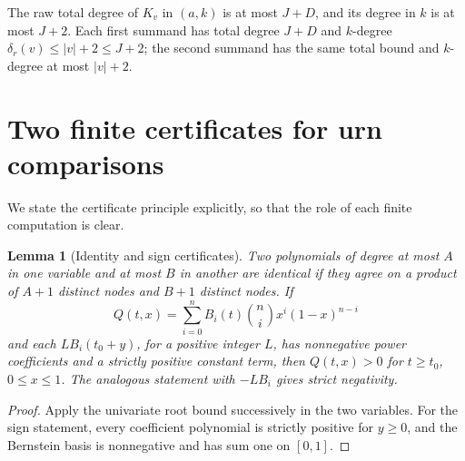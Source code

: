 \documentclass[11pt,a4paper]{article}
\newtheorem{lemma}[theorem]{Lemma}
\theoremstyle{remark}
\numberwithin{equation}{section}
\begin{document}
The raw total degree of \(K_v\) in \((a,k)\) is at most \(J+D\),
and its degree in \(k\) is at most \(J+2\). Each first summand has
total degree \(J+D\) and \(k\)-degree \(\delta_r(v)\le |v|+2\le J+2\);
the second summand has the same total bound and \(k\)-degree
at most \(|v|+2\).

\section{Two finite certificates for urn comparisons}\label{sec:urn}
We state the certificate principle explicitly, so that the role of
each finite computation is clear.

\begin{lemma}[Identity and sign certificates]\label{lem:certificate}
Two polynomials of degree at most \(A\) in one variable and at most
\(B\) in another are identical if they agree on a product of \(A+1\)
distinct nodes and \(B+1\) distinct nodes.
If
\[
 Q(t,x)=\sum_{i=0}^n B_i(t)\binom ni x^i(1-x)^{n-i}
\]
and each \(L B_i(t_0+y)\), for a positive integer \(L\), has
nonnegative power coefficients and a strictly positive constant term,
then \(Q(t,x)>0\) for \(t\ge t_0\), \(0\le x\le1\).
The analogous statement with \(-L B_i\) gives strict negativity.
\end{lemma}
\begin{proof}
Apply the univariate root bound successively in the two variables.
For the sign statement, every coefficient polynomial is strictly
positive for \(y\ge0\), and the Bernstein basis is nonnegative
and has sum one on \([0,1]\).
\end{proof}
\end{document}
